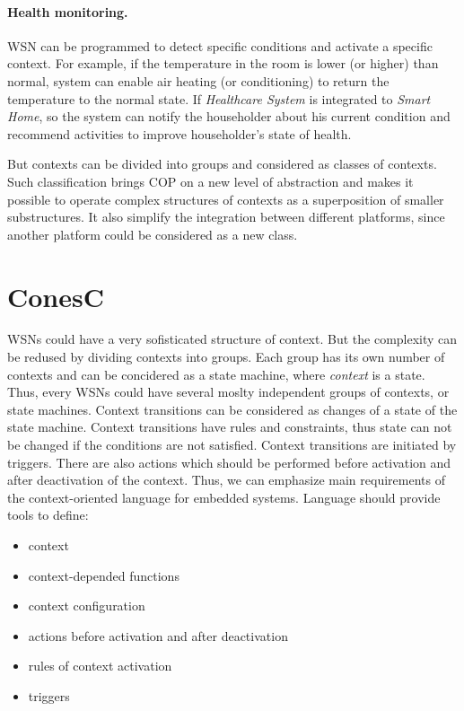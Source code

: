 \documentclass{ubicomp-ext}
\begin{document}
\paragraph{Health monitoring.} WSN can be programmed to detect specific conditions and activate a specific context. For example, if the temperature in the room is lower (or higher) than normal, system can enable air heating (or conditioning) to return the temperature to the normal state. If \textit{Healthcare System} is integrated to \textit{Smart Home}, so the system can notify the householder about his current condition and recommend activities to improve householder's state of health.

But contexts can be divided into groups and considered as classes of contexts. Such classification brings COP on a new level of abstraction and makes it possible to operate complex structures of contexts as a superposition of smaller substructures. It also simplify the integration between different platforms, since another platform could be considered as a new class.

\section{ConesC}
WSNs could have a very sofisticated structure of context. But the complexity can be redused by dividing contexts into groups. Each group has its own number of contexts and can be concidered as a state machine, where \textit{context} is a state. Thus, every WSNs could have several moslty independent groups of contexts, or state machines. Context transitions can be considered as changes of a state of the state machine. Context transitions have rules and constraints, thus state can not be changed if the conditions are not satisfied. Context transitions are initiated by triggers. There are also actions which should be performed before activation and after deactivation of the context. Thus, we can emphasize main requirements of the context-oriented language for embedded systems. Language should provide tools to define:
\begin{itemize}\compresslist
\item context
\item context-depended functions
\item context configuration
\item actions before activation and after deactivation
\item rules of context activation
\item triggers
\end{itemize}
\end{document}
